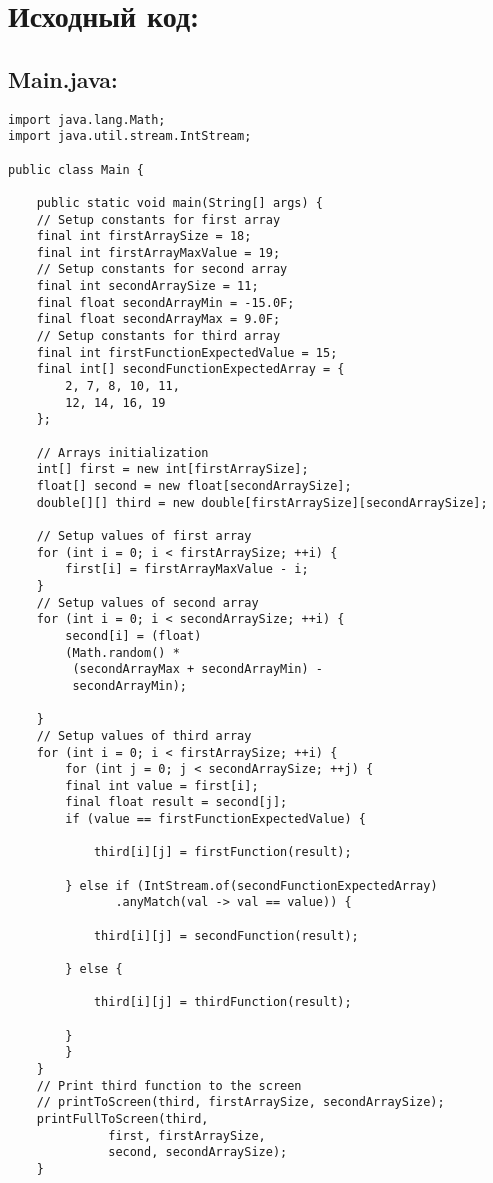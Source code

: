 \documentclass[11pt]{article}
\begin{document}
\vspace{2em}
\section{Исходный код:}
\label{sec:orgcf525e7}
\subsection{Main.java:}
\label{sec:org6500b0c}
\small
\lstset{language=Java,label= ,caption= ,captionpos=b,numbers=none}
\begin{lstlisting}
import java.lang.Math;
import java.util.stream.IntStream;

public class Main {

    public static void main(String[] args) {    
	// Setup constants for first array
	final int firstArraySize = 18;
	final int firstArrayMaxValue = 19;
	// Setup constants for second array
	final int secondArraySize = 11;
	final float secondArrayMin = -15.0F;
	final float secondArrayMax = 9.0F;
	// Setup constants for third array
	final int firstFunctionExpectedValue = 15;
	final int[] secondFunctionExpectedArray = {
	    2, 7, 8, 10, 11,
	    12, 14, 16, 19
	};

	// Arrays initialization
	int[] first = new int[firstArraySize];
	float[] second = new float[secondArraySize];
	double[][] third = new double[firstArraySize][secondArraySize];

	// Setup values of first array
	for (int i = 0; i < firstArraySize; ++i) {
	    first[i] = firstArrayMaxValue - i;
	}
	// Setup values of second array
	for (int i = 0; i < secondArraySize; ++i) {
	    second[i] = (float)
		(Math.random() *
		 (secondArrayMax + secondArrayMin) -
		 secondArrayMin);

	}
	// Setup values of third array
	for (int i = 0; i < firstArraySize; ++i) {
	    for (int j = 0; j < secondArraySize; ++j) {
		final int value = first[i];
		final float result = second[j];
		if (value == firstFunctionExpectedValue) {

		    third[i][j] = firstFunction(result);

		} else if (IntStream.of(secondFunctionExpectedArray)
			   .anyMatch(val -> val == value)) {

		    third[i][j] = secondFunction(result);

		} else {

		    third[i][j] = thirdFunction(result);

		}
	    }
	}
	// Print third function to the screen
	// printToScreen(third, firstArraySize, secondArraySize);
	printFullToScreen(third,
			  first, firstArraySize,
			  second, secondArraySize);
    }


\end{lstlisting}
\end{document}

